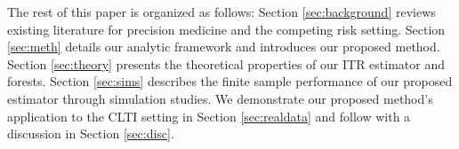 The rest of this paper is organized as follows: Section \ref{sec:background} reviews existing literature for precision medicine and the competing risk setting. Section \ref{sec:meth} details our analytic framework and introduces our proposed method. Section \ref{sec:theory} presents the theoretical properties of our ITR estimator and forests. Section \ref{sec:sims} describes the finite sample performance of our proposed estimator through simulation studies. We demonstrate our proposed method's application to the CLTI setting in Section \ref{sec:realdata} and follow with a discussion in Section \ref{sec:disc}.
